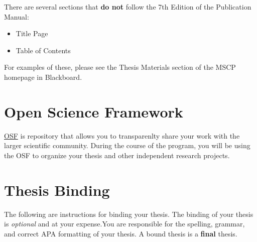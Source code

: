 \documentclass[openany]{book}
\providecommand{\tightlist}{%
  \setlength{\itemsep}{0pt}\setlength{\parskip}{0pt}}
\begin{document}
There are several sections that \textbf{do not} follow the 7th Edition of the Publication Manual:

\begin{itemize}
\tightlist
\item
  Title Page
\item
  Table of Contents
\end{itemize}

For examples of these, please see the Thesis Materials section of the MSCP homepage in Blackboard.

\hypertarget{open-science-framework}{%
\chapter{Open Science Framework}\label{open-science-framework}}

\href{https://osf.io/}{OSF} is repository that allows you to transparenlty share your work with the larger scientific community. During the course of the program, you will be using the OSF to organize your thesis and other independent research projects.

\hypertarget{thesis-binding}{%
\chapter{Thesis Binding}\label{thesis-binding}}

The following are instructions for binding your thesis. The binding of your thesis is \emph{optional} and at your expense.You are responsible for the spelling, grammar, and correct APA formatting of your thesis. A bound thesis is a \textbf{final} thesis.
\end{document}
